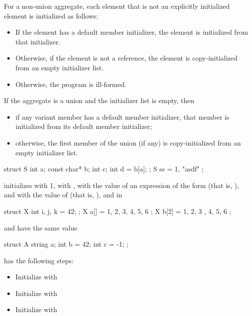 \pnum
For a non-union aggregate,
each element that is not an explicitly initialized element
is initialized as follows:
\begin{itemize}
\item
If the element has a default member initializer,
the element is initialized from that initializer.
\item
Otherwise, if the element is not a reference, the element
is copy-initialized from an empty initializer list.
\item
Otherwise, the program is ill-formed.
\end{itemize}
If the aggregate is a union and the initializer list is empty, then
\begin{itemize}
\item
if any variant member has a default member initializer,
that member is initialized from its default member initializer;
\item
otherwise, the first member of the union (if any)
is copy-initialized from an empty initializer list.
\end{itemize}
\begin{example}
\begin{codeblock}
struct S { int a; const char* b; int c; int d = b[a]; };
S ss = { 1, "asdf" };
\end{codeblock}
initializes
with 1,
with ,
with the value of an expression of the form
(that is, ), and  with the value of 
(that is, ), and in
\begin{codeblock}
struct X { int i, j, k = 42; };
X a[] = { 1, 2, 3, 4, 5, 6 };
X b[2] = { { 1, 2, 3 }, { 4, 5, 6 } };
\end{codeblock}
 and  have the same value

\begin{codeblock}
struct A {
  string a;
  int b = 42;
  int c = -1;
};
\end{codeblock}

 has the following steps:
\begin{itemize}
\item Initialize  with \tcode{\{\}}
\item Initialize  with 
\item Initialize  with 
\end{itemize}
\end{example}

